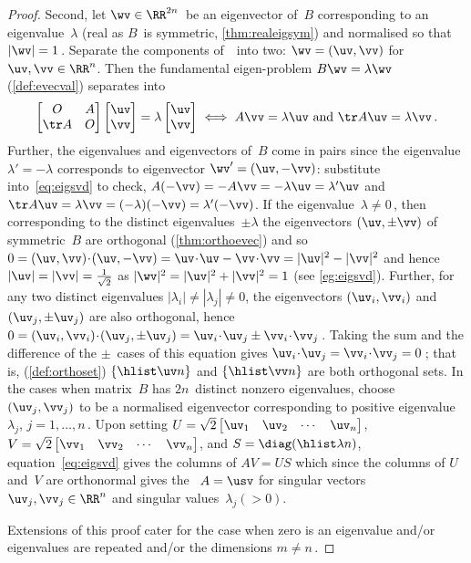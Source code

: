 \begin{proof}
Second, let \(\wv\in\RR^{2n}\)\ be an eigenvector of~\(B\) corresponding to an eigenvalue~\(\lambda\) (real as \(B\)~is symmetric, \autoref{thm:realeigsym}) and normalised so that \(|\wv|=1\)\,.
Separate the components of~\wv\ into two: \(\wv=(\uv,\vv)\) for \(\uv,\vv\in\RR^n\).
Then the fundamental eigen-problem \(B\wv=\lambda\wv\)  (\autoref{def:evecval}) separates into
\begin{equation}
\begin{bmatrix} O& A\\\tr A&O \end{bmatrix}\begin{bmatrix} \uv\\\vv \end{bmatrix}=\lambda\begin{bmatrix} \uv\\\vv \end{bmatrix}
\iff  A\vv=\lambda\uv \text{ and }\tr A\uv=\lambda\vv\,.
\label{eq:eigsvd}
\end{equation}
Further, the eigenvalues and eigenvectors of~\(B\) come in pairs since the eigenvalue \(\lambda'=-\lambda\) corresponds to eigenvector \(\wv'=(\uv,-\vv)\): substitute into~\eqref{eq:eigsvd} to check, \(A(-\vv)=-A\vv=-\lambda\uv=\lambda'\uv\) and \(\tr A\uv=\lambda\vv=(-\lambda)(-\vv)=\lambda'(-\vv)\).
If the eigenvalue~\(\lambda\neq0\)\,, then corresponding to the distinct eigenvalues~\(\pm\lambda\) the eigenvectors \((\uv,\pm\vv)\) of symmetric~\(B\) are orthogonal (\autoref{thm:orthoevec}) and so \(0=(\uv,\vv)\cdot(\uv,-\vv)=\uv\cdot\uv-\vv\cdot\vv=|\uv|^2-|\vv|^2\) and hence \(|\uv|=|\vv|=\frac1{\sqrt2}\) as \(|\wv|^2=|\uv|^2+|\vv|^2=1\) (see \autoref{eg:eigsvd}).
Further, for any two distinct eigenvalues \(|\lambda_i|\neq|\lambda_j|\neq 0\), the eigenvectors \((\uv_i,\vv_i)\) and \((\uv_j,\pm\uv_j)\) are also orthogonal, hence \(0 =(\uv_i,\vv_i)\cdot(\uv_j,\pm\uv_j) =\uv_i\cdot\uv_j \pm\vv_i\cdot\vv_j\)\,.
Taking the sum and the difference of the \(\pm\)~cases of this equation gives \(\uv_i\cdot\uv_j=\vv_i\cdot\vv_j=0\)\,; that is,  (\autoref{def:orthoset}) \(\{\hlist\uv n\}\) and \(\{\hlist\vv n\}\) are both orthogonal sets.
In the cases when matrix~\(B\) has \(2n\)~distinct nonzero eigenvalues, choose \((\uv_j,\vv_j)\) to be a normalised eigenvector corresponding to positive eigenvalue~\(\lambda_j\), \(j=1,\ldots,n\)\,. 
Upon setting \(U=\sqrt2\begin{bmatrix} \uv_1&\uv_2&\cdots&\uv_n \end{bmatrix}\), \(V=\sqrt2\begin{bmatrix} \vv_1&\vv_2&\cdots&\vv_n \end{bmatrix}\), and \(S=\diag(\hlist\lambda n)\), equation~\eqref{eq:eigsvd} gives the columns of \(AV=US\) which since the columns of \(U\) and~\(V\) are orthonormal gives the \svd\ \(A=\usv\) for singular vectors \(\uv_j,\vv_j\in\RR^n\) and singular values~\(\lambda_j(>0)\).

Extensions of this proof cater for the case when zero is an eigenvalue and/or eigenvalues are repeated and/or the dimensions \(m\neq n\)\,.
\end{proof}


